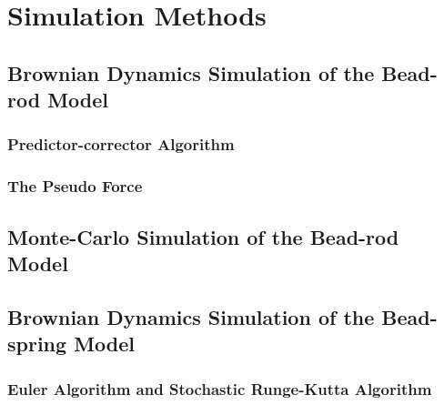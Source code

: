 \chapter{Simulation Methods}

\ifpdf
    \graphicspath{{Chapter3/Figs/Raster/}{Chapter3/Figs/PDF/}{Chapter3/Figs/}}
\else
    \graphicspath{{Chapter3/Figs/Vector/}{Chapter3/Figs/}}
\fi

\section{Brownian Dynamics Simulation of the Bead-rod Model}
\label{sec:brownian_dynamics_simulation_of_the_bead_rod_model}

\subsection{Predictor-corrector Algorithm}
\label{sub:predictor_corrector_algorithm}

\subsection{The Pseudo Force}
\label{sub:the_pseudo_force}





\section{Monte-Carlo Simulation of the Bead-rod Model}
\label{sec:monte_carlo_simulation_of_the_bead_rod_model}



\section{Brownian Dynamics Simulation of the Bead-spring Model}
\label{sec:brownian_dynamics_simulation_of_the_bead_spring_model}

\subsection{Euler Algorithm and Stochastic Runge-Kutta Algorithm}
\label{sub:euler_algorithm_and_stochastic_runge_kutta_algorithm}

